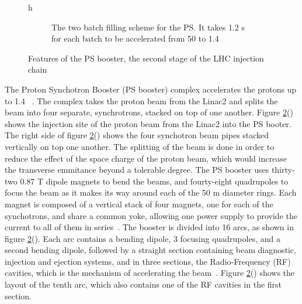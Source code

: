 \begin{figure}{h}
\begin{subfigure}[h]{0.4\textwidth}
        \caption{The two batch filling scheme for the PS.  It takes
          1.2 s for each batch to be accelerated from 50 \MeV to 1.4 \GeV}\label{fig:psbooster_2batchScheme}
      \end{subfigure}
      \caption{Features of the PS booster, the second stage of
        the LHC injection chain}\label{fig:psbooster}
\end{figure}

\par The Proton Synchotron Booster (PS booster) complex accelerates
the protons up to 1.4
\GeV~\cite{LHC:TDR_Vol3_InjectionChain_Benedikt}.  The complex takes
the proton beam from the Linac2 and splits the beam into four
separate, synchrotrons, stacked on top of one another.  Figure
\ref{fig:psbooster}() shows the
injection site of the proton beam from the Linac2 into the PS booter.
The right side of figure
\ref{fig:psbooster}() shows the four
synchotron beam pipes stacked vertically on top one another.  The
splitting of the beam is done in order to reduce the effect of the
space charge of the proton beam, which would increase the transverse
emmitance beyond a tolerable degree.  The PS booster uses thirty-two
0.87 T dipole magnets to bend the beams, and fourty-eight quadrupoles
to focus the beam as it makes its way around each of the 50 m diameter
rings.  Each magnet is composed of a vertical stack of four magnets,
one for each of the synchotrons, and share a common yoke, allowing one
power supply to provide the current to all of them in 
series~\cite{LHC:LHC_psbooster_boosterTurns40}.  The booster is
divided into 16 arcs, as shown in figure
\ref{fig:psbooster}().  Each arc contains
a bending dipole, 3 focusing quadrupoles, and a second bending dipole,
followed by a straight section containing beam diagnostic, injection
and ejection systems, and in three sections, the Radio-Frequency (RF) cavities, which is
the mechanism of accelerating the
beam~\cite{LHC:LHC_psbooster_layout}.  Figure
\ref{fig:psbooster}() shows the layout
of the tenth arc, which also contains one of the RF cavities in the first
section.
  
